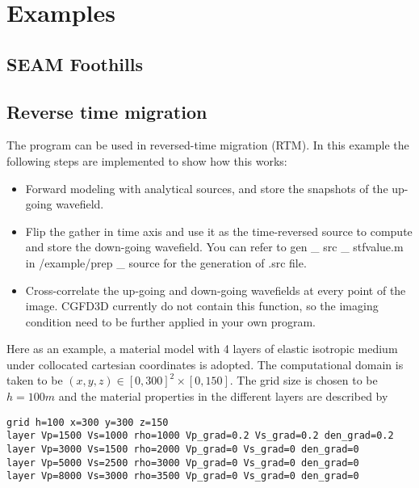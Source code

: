 \chapter{Examples}\label{chapter-examples}
\section{SEAM Foothills}
\section{Reverse time migration}
The program can be used in reversed-time migration (RTM).  In this example the following steps are implemented to show how this works:
\begin{itemize}
\item Forward modeling with analytical sources, and store the snapshots of the up-going wavefield.
\item Flip the gather in time axis and use it as the time-reversed source to compute and store the down-going wavefield. You can refer to gen \_ src \_ stfvalue.m in /example/prep \_ source for the generation of .src file.
\item Cross-correlate the up-going and down-going wavefields at every point of the image. CGFD3D currently do not contain this function, so the imaging condition need to be further applied in your own program. 
\end{itemize}
Here as an example, a material model with 4 layers of elastic isotropic medium under collocated cartesian coordinates is adopted. The computational domain is taken to be $(x,y,z)\in[0,300]^{2}\times[0,150] $. The grid size is chosen to be $h=100m$ and the material properties in the different layers are described by 
\begin{lstlisting}
grid h=100 x=300 y=300 z=150
layer Vp=1500 Vs=1000 rho=1000 Vp_grad=0.2 Vs_grad=0.2 den_grad=0.2
layer Vp=3000 Vs=1500 rho=2000 Vp_grad=0 Vs_grad=0 den_grad=0
layer Vp=5000 Vs=2500 rho=3000 Vp_grad=0 Vs_grad=0 den_grad=0
layer Vp=8000 Vs=3000 rho=3500 Vp_grad=0 Vs_grad=0 den_grad=0
\end{lstlisting}


